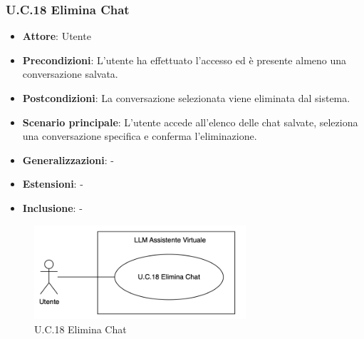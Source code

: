 \subsubsection{U.C.18 Elimina Chat}
\begin{itemize}
    \item \textbf{Attore}: Utente
    \item \textbf{Precondizioni}: L'utente ha effettuato l'accesso ed è presente almeno una conversazione salvata.
    \item \textbf{Postcondizioni}: La conversazione selezionata viene eliminata dal sistema.
    \item \textbf{Scenario principale}: L'utente accede all'elenco delle chat salvate, seleziona una conversazione specifica e conferma l'eliminazione.
    \item \textbf{Generalizzazioni}: -
    \item \textbf{Estensioni}: -
    \item \textbf{Inclusione}: -
\end{itemize}
\begin{figure}[H]
    \centering
    \includegraphics[width=0.7\textwidth]{img/UC18.png}
    \caption{U.C.18 Elimina Chat}
\end{figure}
\newpage

